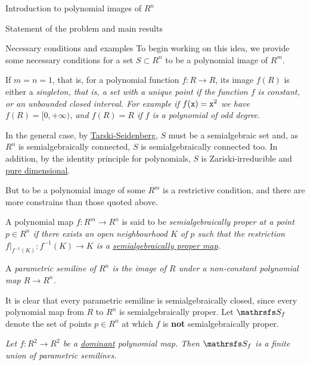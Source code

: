 \documentclass[11pt, a4paper, english, twoside, notitlepage, openright]{report}
\begin{document}
\begin{chapter}{Introduction to polynomial images of $R^n$}
\begin{section}{Statement of the problem and main results}
\begin{subsection}{Necessary conditions and examples} To begin working on this idea, we provide some necessary conditions for a set $S\subset R^n$ to be a polynomial image of $R^m$. 
	
If $m=n=1$, that is, for a polynomial function $f:R\to R$, its image $f(R)$ is either a \em singleton, \em that is, a set with a unique point if the function $f$ is constant, or an unbounded closed interval. For example if $f({\tt x})={\tt x}^2$ we have $f(R)=[0,+\infty)$, and $f(R)=R$ if $f$ is a polynomial of odd degree.
	
In the general case, by \hyperref[tarskiSeidenberg]{Tarski-Seidenberg}, $S$ must be a semialgebraic set and, as $R^n$ is semialgebraically connected, $S$ is semialgebraically connected too. In addition, by the identity principle for polynomials, $S$ is Zariski-irreducible and \hyperref[pureDim]{pure dimensional}.
	
	
But to be a polynomial image of some $R^m$ is a restrictive condition, and there are more constrains than those quoted above. 
	
\begin{definition} A polynomial map $f:R^m\to R^n$ is said to be \em semialgebraically proper at a point $p\in R^n$ \em if there exists an open neighbourhood $K$ of $p$ such that the restriction $f|_{f^{-1}(K)}:f^{-1}(K)\to K$ is a \hyperref[properMap]{semialgebraically proper map}.
\end{definition}
	
\begin{definition} A \em parametric semiline \em of $R^n$ is the image of $R$ under a non-constant polynomial map $R\to R^n$.
\end{definition}
	
It is clear that every parametric semiline is semialgebraically closed, since every polynomial map from $R$ to $R^n$ is semialgebraically proper. Let $\S_f$ denote the set of points $p\in R^n$ at which $f$ is \textbf{not} semialgebraically proper.
	
\begin{theorem}[\em Jelonek\em]\label{jelonek}\em Let $f:R^2\to R^2$ be a \hyperref[dominant]{dominant} polynomial map. Then $\S_f$ is a finite union of parametric semilines.\em
\end{theorem}
	

\end{subsection}
\end{section}
\end{chapter}
\end{document}
